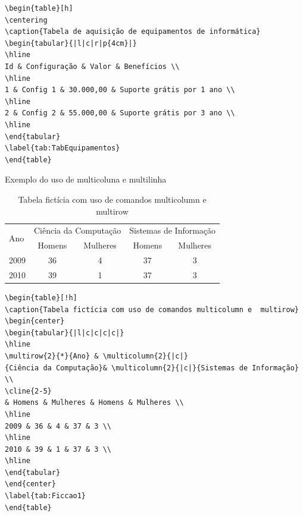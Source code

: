 \begin{verbatim}
\begin{table}[h]
\centering
\caption{Tabela de aquisição de equipamentos de informática}
\begin{tabular}{|l|c|r|p{4cm}|}
\hline
Id & Configuração & Valor & Benefícios \\
\hline
1 & Config 1 & 30.000,00 & Suporte grátis por 1 ano \\
\hline	
2 & Config 2 & 55.000,00 & Suporte grátis por 3 ano \\
\hline
\end{tabular} 
\label{tab:TabEquipamentos}
\end{table}
\end{verbatim}


Exemplo do uso de multicoluna e multilinha

\begin{table}[!h]
\caption{Tabela fictícia com uso de comandos multicolumn e  multirow}
\begin{center}
\begin{tabular}{|l|c|c|c|c|}
\hline
 \multirow{2}{*}{Ano} & \multicolumn{2}{|c|}{Ciência da Computação}&
\multicolumn{2}{|c|}{Sistemas de Informação} \\ 
\cline{2-5}
& Homens & Mulheres & Homens & Mulheres \\
\hline
2009 & 36 & 4 & 37 & 3 \\
\hline
2010 & 39 & 1 & 37 & 3 \\
\hline
\end{tabular}
\end{center}
\label{tab:Ficcao1}
\end{table}

\begin{verbatim}
\begin{table}[!h]
\caption{Tabela fictícia com uso de comandos multicolumn e  multirow}
\begin{center}
\begin{tabular}{|l|c|c|c|c|}
\hline
\multirow{2}{*}{Ano} & \multicolumn{2}{|c|}
{Ciência da Computação}& \multicolumn{2}{|c|}{Sistemas de Informação} \\ 
\cline{2-5}
& Homens & Mulheres & Homens & Mulheres \\
\hline
2009 & 36 & 4 & 37 & 3 \\
\hline
2010 & 39 & 1 & 37 & 3 \\
\hline
\end{tabular}
\end{center}
\label{tab:Ficcao1}
\end{table}
\end{verbatim}

